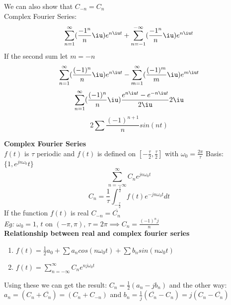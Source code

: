 \documentclass[11pt]{article}
\theoremstyle{definition}
\begin{document}
We can also show that $C_{-n} = C_n$\\
Complex Fourier Series: $$\sum_{n = 1}^\infty (\frac{-1^n}{n}\iu)e^{n\iu t} + \sum_{n = -1}^{-\infty} (\frac{-1^n}{n}\iu)e^{n\iu t}$$
If the second sum let $m = -n$
$$\sum_{n = 1}^\infty (\frac{(-1)^n}{n}\iu)e^{n\iu t} - \sum_{m = 1}^{\infty} (\frac{(-1)^m}{m}\iu)e^{m\iu t}$$
$$\sum_{n = 1}^\infty (\frac{(-1)^n}{n}\iu)\frac{e^{n\iu t} - e^{-n \iu t}}{2\iu}2\iu$$
$$2\sum\frac{(-1)^{n+1}}{n}sin(nt)$$

\newpage
\textbf{Complex Fourier Series}\\
$f(t)$ is $\tau$ periodic and $f(t)$ is defined on $[-\frac{\tau}{2}, \frac{\tau}{2}]$ with $\omega_0 = \frac{2\pi}{\tau}$
Basis: $\{1, e^{jn\omega_0}t\}$
$$\sum_{n=-\infty}^\infty C_n e^{jn\omega_0 t}$$
$$C_n = \frac{1}{\tau}\int^\frac{\tau}{2}_{-\frac{\tau}{2}}f(t)e^{-jn\omega_0 t}dt$$
If the function $f(t)$ is real $C_{-n} = \overline{C_n}$\\
\textit{Eg:} $\omega_0 = 1$, $t \text{ on } (-\pi, \pi)$, $\tau = 2\pi \implies C_n = \frac{(-1)^nj}{n}$\\
\textbf{Relationship between real and complex fourier series}
\begin{enumerate}[topsep=-10pt]
    \item $f(t) = \frac{1}{2}a_0 + \sum a_n cos(n\omega_0 t) + \sum b_n sin(n\omega_0 t)$
    \item $f(t) = \sum_{n=-\infty}^\infty C_n e^{nj\omega_0 t}$
\end{enumerate}
Using these we can get the result: $C_n = \frac{1}{2}(a_n - jb_n)$ and the other way: $a_n = (C_n + \overline{C_n}) = (C_n + {C_{-n}})$ and $b_n = \frac{1}{j}(\overline{C_n} - C_n) = j(C_n - \overline{C_n})$\\
\hfill\break
\end{document}
